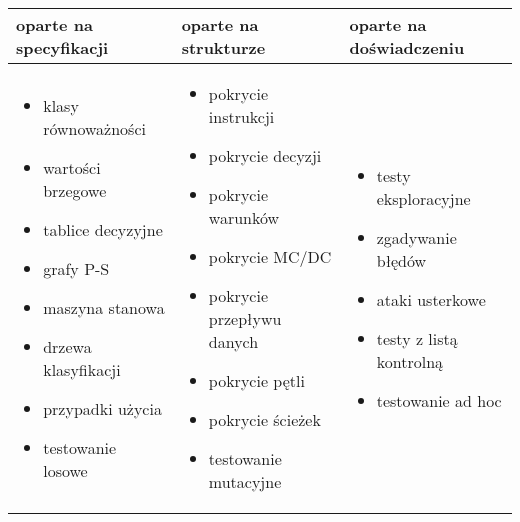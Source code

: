 \documentclass[../main.tex]{subfiles}
\begin{document}
    \begin{table}[H]
        \begin{center}
            \begin{tabular}{ p{5cm} p{5cm} p{5cm} }
                \toprule
                \textbf{oparte na specyfikacji} & \textbf{oparte na strukturze} & \textbf{oparte na doświadczeniu} \\
                \toprule
                \begin{itemize}
                    \item klasy równoważności
                    \item wartości brzegowe
                    \item tablice decyzyjne
                    \item grafy P-S
                    \item maszyna stanowa
                    \item drzewa klasyfikacji
                    \item przypadki użycia
                    \item testowanie losowe
                \end{itemize}
                &
                \begin{itemize}
                    \item pokrycie instrukcji
                    \item pokrycie decyzji
                    \item pokrycie warunków
                    \item pokrycie MC/DC
                    \item pokrycie przepływu danych
                    \item pokrycie pętli
                    \item pokrycie ścieżek
                    \item testowanie mutacyjne
                \end{itemize}
                &
                \begin{itemize}
                    \item testy eksploracyjne
                    \item zgadywanie błędów
                    \item ataki usterkowe
                    \item testy z listą kontrolną
                    \item testowanie ad hoc
                \end{itemize} \\
            \end{tabular}
        \end{center}
    \end{table}
\end{document}
